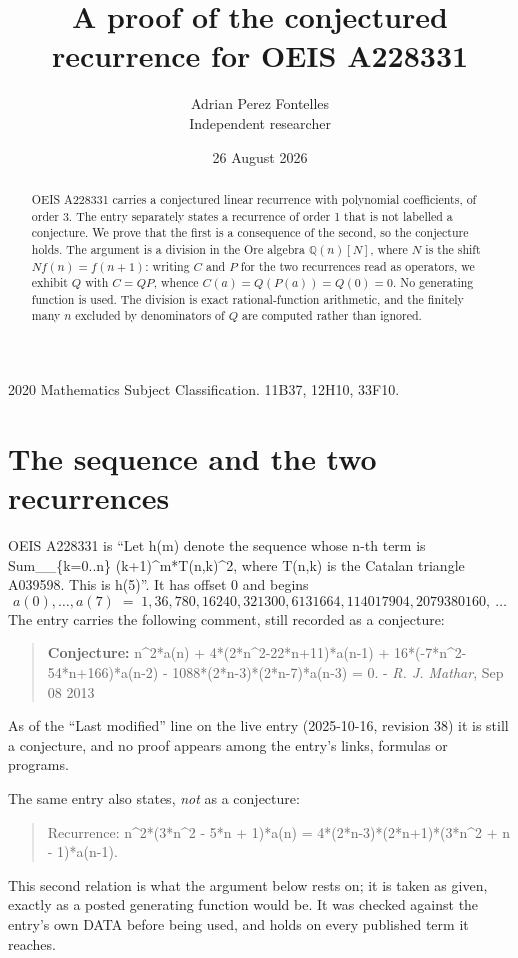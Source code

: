 \documentclass[11pt,a4paper]{article}
\title{A proof of the conjectured recurrence for OEIS A228331}
\author{Adrian Perez Fontelles\\ \small Independent researcher}
\date{26 August 2026}
\theoremstyle{plain}
\theoremstyle{definition}
\begin{document}
\maketitle

\begin{abstract}
OEIS A228331 carries a conjectured linear recurrence with polynomial coefficients, of
order 3. The entry separately states a recurrence of order 1 that is not
labelled a conjecture. We prove that the first is a consequence of the second, so the
conjecture holds. The argument is a division in the Ore algebra
$\mathbb{Q}(n)[N]$, where $N$ is the shift $Nf(n)=f(n+1)$: writing $C$ and $P$ for the two
recurrences read as operators, we exhibit $Q$ with $C=QP$, whence
$C(a)=Q(P(a))=Q(0)=0$. No generating function is used. The division is exact
rational-function arithmetic, and the finitely many $n$ excluded by denominators of $Q$
are computed rather than ignored.
\end{abstract}

\noindent\small 2020 Mathematics Subject Classification. 11B37, 12H10, 33F10.\normalsize

\section{The sequence and the two recurrences}

OEIS A228331 is ``Let h(m) denote the sequence whose n-th term is Sum\_\_\{k=0..n\} (k+1)\^{}m*T(n,k)\^{}2, where T(n,k) is the Catalan triangle A039598. This is h(5)''. It has offset $0$ and begins
\[
a(0),\dots,a(7)\;=\;1, 36, 780, 16240, 321300, 6131664, 114017904, 2079380160,\ \dots
\]
The entry carries the following comment, still recorded as a conjecture:
\begin{quote}\small
\textbf{Conjecture:} n\^{}2*a(n) + 4*(2*n\^{}2-22*n+11)*a(n-1) + 16*(-7*n\^{}2-54*n+166)*a(n-2) - 1088*(2*n-3)*(2*n-7)*a(n-3) = 0. - \emph{R. J. Mathar}, Sep 08 2013
\end{quote}
As of the ``Last modified'' line on the live entry (2025-10-16, revision 38) it is still
a conjecture, and no proof appears among the entry's links, formulas or programs.

The same entry also states, \emph{not} as a conjecture:
\begin{quote}\small
Recurrence: n\^{}2*(3*n\^{}2 - 5*n + 1)*a(n) = 4*(2*n-3)*(2*n+1)*(3*n\^{}2 + n - 1)*a(n-1).
\end{quote}
This second relation is what the argument below rests on; it is taken as given, exactly as
a posted generating function would be. It was checked against the entry's own DATA before
being used, and holds on every published term it reaches.
\end{document}
